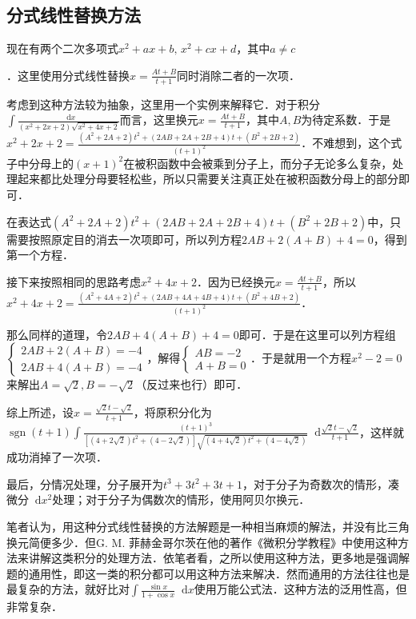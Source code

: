 \documentclass{ctexbook}
\DeclareMathOperator{\sgn}{sgn}
\newcommand*{\dif}{\mathop{}\!\mathrm{d}}
\begin{document}
\subsection{分式线性替换方法}
现在有两个二次多项式$x^{2}+ax+b,\,x^{2}+cx+d$，其中$a\ne c$\par．这里使用分式线性替换$x=\frac{At+B}{t+1}$同时消除二者的一次项．\par
考虑到这种方法较为抽象，这里用一个实例来解释它．对于积分$\int\frac{\dif{x}}{\left(x^{2}+2x+2\right)\sqrt{x^{2}+4x+2}}$而言，这里换元$x=\frac{At+B}{t+1}$，其中$A,B$为待定系数．于是$x^{2}+2x+2=\frac{\left(A^{2}+2A+2\right)t^{2}+\left(2AB+2A+2B+4\right)t+\left(B^{2}+2B+2\right)}{\left(t+1\right)^{2}}$．不难想到，这个式子中分母上的$\left(x+1\right)^{2}$在被积函数中会被乘到分子上，而分子无论多么复杂，处理起来都比处理分母要轻松些，所以只需要关注真正处在被积函数分母上的部分即可．\par
在表达式$\left(A^{2}+2A+2\right)t^{2}+\left(2AB+2A+2B+4\right)t+\left(B^{2}+2B+2\right)$中，只需要按照原定目的消去一次项即可，所以列方程$2AB+2\left(A+B\right)+4=0$，得到第一个方程．\par
接下来按照相同的思路考虑$x^{2}+4x+2$．因为已经换元$x=\frac{At+B}{t+1}$，所以$x^{2}+4x+2=\frac{\left(A^{2}+4A+2\right)t^{2}+\left(2AB+4A+4B+4\right)t+\left(B^{2}+4B+2\right)}{\left(t+1\right)^{2}}$．\par
那么同样的道理，令$2AB+4\left(A+B\right)+4=0$即可．于是在这里可以列方程组$\begin{cases}2AB+2\left(A+B\right)=-4\\2AB+4\left(A+B\right)=-4\end{cases}$，解得$\begin{cases}AB=-2\\A+B=0\end{cases}$．于是就用一个方程$x^{2}-2=0$来解出$A=\sqrt{2},B=-\sqrt{2}$（反过来也行）即可．\par
综上所述，设$x=\frac{\sqrt{2}t-\sqrt{2}}{t+1}$，将原积分化为$\sgn{\left(t+1\right)}\int\frac{\left(t+1\right)^{3}}{\left[\left(4+2\sqrt{2}\right)t^{2}+\left(4-2\sqrt{2}\right)\right]\sqrt{\left(4+4\sqrt{2}\right)t^{2}+\left(4-4\sqrt{2}\right)}}\dif{\frac{\sqrt{2}t-\sqrt{2}}{t+1}}$，这样就成功消掉了一次项．\par
最后，分情况处理，分子展开为$t^{3}+3t^{2}+3t+1$，对于分子为奇数次的情形，凑微分$\dif{x^{2}}$处理；对于分子为偶数次的情形，使用阿贝尔换元．\par
笔者认为，用这种分式线性替换的方法解题是一种相当麻烦的解法，并没有比三角换元简便多少．但{\selectfont G. M. }菲赫金哥尔茨在他的著作《微积分学教程》中使用这种方法来讲解这类积分的处理方法．依笔者看，之所以使用这种方法，更多地是强调解题的通用性，即这一类的积分都可以用这种方法来解决．然而通用的方法往往也是最复杂的方法，就好比对$\int\frac{\sin{x}}{1+\cos{x}}\dif{x}$使用万能公式法．这种方法的泛用性高，但非常复杂．\par
\end{document}
